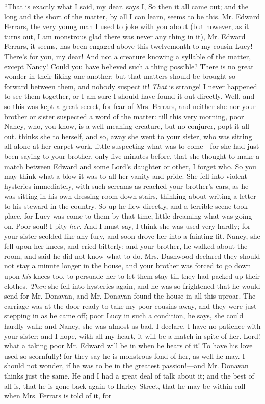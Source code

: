 “That is exactly what I said, my dear.  says I,  So then it all came out; and the long and the short of the matter, by all I can learn, seems to be this. Mr. Edward Ferrars, the very young man I used to joke with you about (but however, as it turns out, I am monstrous glad there was never any thing in it), Mr. Edward Ferrars, it seems, has been engaged above this twelvemonth to my cousin Lucy!---There's for you, my dear! And not a creature knowing a syllable of the matter, except Nancy! Could you have believed such a thing possible? There is no great wonder in their liking one another; but that matters should be brought so forward between them, and nobody suspect it! {\em That} is strange! I never happened to see them together, or I am sure I should have found it out directly. Well, and so this was kept a great secret, for fear of Mrs. Ferrars, and neither she nor your brother or sister suspected a word of the matter: till this very morning, poor Nancy, who, you know, is a well-meaning creature, but no conjurer, popt it all out.  thinks she to herself,  and so, away she went to your sister, who was sitting all alone at her carpet-work, little suspecting what was to come---for she had just been saying to your brother, only five minutes before, that she thought to make a match between Edward and some Lord's daughter or other, I forget who. So you may think what a blow it was to all her vanity and pride. She fell into violent hysterics immediately, with such screams as reached your brother's ears, as he was sitting in his own dressing-room down stairs, thinking about writing a letter to his steward in the country. So up he flew directly, and a terrible scene took place, for Lucy was come to them by that time, little dreaming what was going on. Poor soul! I pity {\em her}. And I must say, I think she was used very hardly; for your sister scolded like any fury, and soon drove her into a fainting fit. Nancy, she fell upon her knees, and cried bitterly; and your brother, he walked about the room, and said he did not know what to do. Mrs. Dashwood declared they should not stay a minute longer in the house, and your brother was forced to go down upon {\em his} knees too, to persuade her to let them stay till they had packed up their clothes. {\em Then} she fell into hysterics again, and he was so frightened that he would send for Mr. Donavan, and Mr. Donavan found the house in all this uproar. The carriage was at the door ready to take my poor cousins away, and they were just stepping in as he came off; poor Lucy in such a condition, he says, she could hardly walk; and Nancy, she was almost as bad. I declare, I have no patience with your sister; and I hope, with all my heart, it will be a match in spite of her. Lord! what a taking poor Mr. Edward will be in when he hears of it! To have his love used so scornfully! for they say he is monstrous fond of her, as well he may. I should not wonder, if he was to be in the greatest passion!---and Mr. Donavan thinks just the same. He and I had a great deal of talk about it; and the best of all is, that he is gone back again to Harley Street, that he may be within call when Mrs. Ferrars is told of it, for 